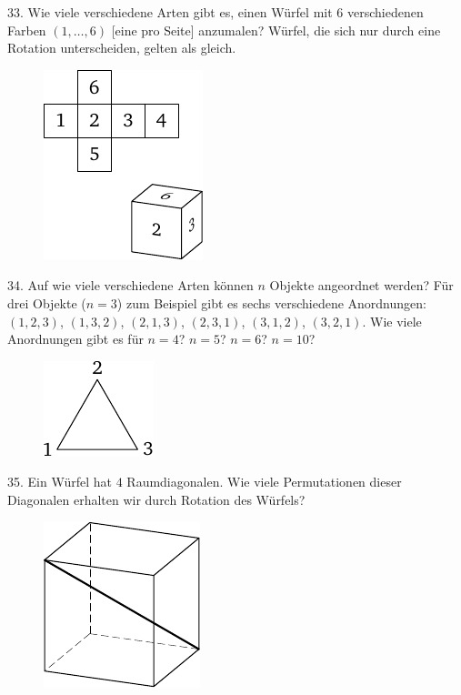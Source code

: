 \begin{problem}{33.}
	Wie viele verschiedene Arten gibt es, einen Würfel mit $6$ verschiedenen Farben $(1,\dotsc,6)$ [eine pro Seite] anzumalen? Würfel, die sich nur durch eine Rotation unterscheiden, gelten als gleich.
	\begin{figure}
		\includegraphics{taskbook-17}
	\end{figure}
\end{problem}

\begin{problem}{34.}
	Auf wie viele verschiedene Arten können $n$ Objekte angeordnet werden? 
	Für drei Objekte ($n=3$) zum Beispiel gibt es sechs verschiedene Anordnungen: $(1,2,3)$, $(1,3,2)$, $(2,1,3)$, $(2,3,1)$, $(3,1,2)$, $(3,2,1)$. 
	Wie viele Anordnungen gibt es für $n=4$? $n=5$? $n=6$? $n=10$?
	\begin{figure}
		\includegraphics{taskbook-18}
	\end{figure}
\end{problem}

\begin{problem}{35.}
	Ein Würfel hat $4$ Raumdiagonalen. Wie viele Permutationen dieser Diagonalen erhalten wir durch Rotation des Würfels?
	\begin{figure}
		\includegraphics{taskbook-19}
	\end{figure}
\end{problem}

